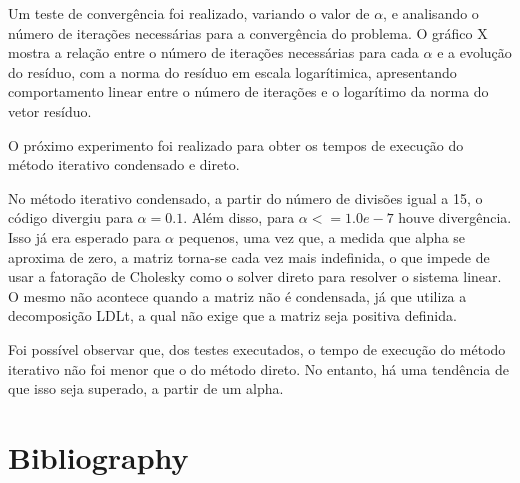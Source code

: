 \documentclass[12pt]{article}
\begin{document}
Um teste de convergência foi realizado, variando o valor de \(\alpha\), e analisando o número de iterações necessárias para a convergência do
problema. O gráfico X mostra a relação entre o número de iterações necessárias para cada \(\alpha\) e a evolução do resíduo, com a norma do 
resíduo em escala logarítimica, apresentando comportamento linear entre o número de iterações e o logarítimo da norma do vetor resíduo.



O próximo experimento foi realizado para obter os tempos de execução do método iterativo condensado e direto. %

No método iterativo condensado, a partir do número de divisões igual a 15, o código divergiu para \(\alpha=0.1\). Além disso, para \(\alpha<=1.0e-7\) 
houve divergência. Isso já era esperado para \(\alpha\) pequenos, uma vez que, a medida que alpha se aproxima de zero, a matriz torna-se cada vez 
mais indefinida, o que impede de usar a fatoração de Cholesky como o solver direto para resolver o sistema linear. O mesmo não acontece quando a 
matriz não é condensada, já que utiliza a decomposição LDLt, a qual não exige que a matriz seja positiva definida.

Foi possível observar que, dos testes executados, o tempo de execução do método iterativo não foi menor que o do método direto. No entanto, há uma 
tendência de que isso seja superado, a partir de um alpha.

\section{Bibliography}
\end{document}
